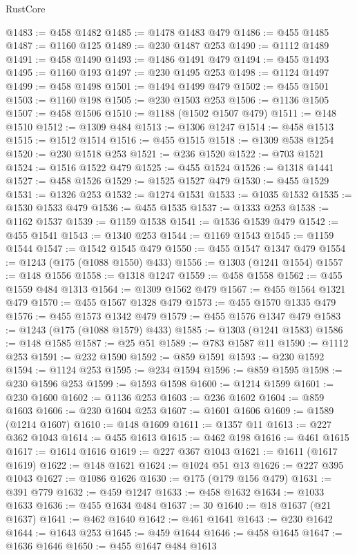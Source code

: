 \begin{lexlean}{RustCore}
\begin{coremodule}
@1483 := @458 @1482
@1485 := @1478 @1483 @479
@1486 := @455 @1485
@1487 := @1160 @125
@1489 := @230 @1487 @253
@1490 := @1112 @1489
@1491 := @458 @1490
@1493 := @1486 @1491 @479
@1494 := @455 @1493
@1495 := @1160 @193
@1497 := @230 @1495 @253
@1498 := @1124 @1497
@1499 := @458 @1498
@1501 := @1494 @1499 @479
@1502 := @455 @1501
@1503 := @1160 @198
@1505 := @230 @1503 @253
@1506 := @1136 @1505
@1507 := @458 @1506
@1510 := @1188 (@1502 @1507 @479)
@1511 := @148 @1510
@1512 := @1309 @484
@1513 := @1306 @1247
@1514 := @458 @1513
@1515 := @1512 @1514
@1516 := @455 @1515
@1518 := @1309 @538 @1254
@1520 := @230 @1518 @253
@1521 := @236 @1520
@1522 := @703 @1521
@1524 := @1516 @1522 @479
@1525 := @455 @1524
@1526 := @1318 @1441
@1527 := @458 @1526
@1529 := @1525 @1527 @479
@1530 := @455 @1529
@1531 := @1326 @253
@1532 := @1274 @1531
@1533 := @1035 @1532
@1535 := @1530 @1533 @479
@1536 := @455 @1535
@1537 := @1333 @253
@1538 := @1162 @1537
@1539 := @1159 @1538
@1541 := @1536 @1539 @479
@1542 := @455 @1541
@1543 := @1340 @253
@1544 := @1169 @1543
@1545 := @1159 @1544
@1547 := @1542 @1545 @479
@1550 := @455 @1547 @1347 @479
@1554 := @1243 (@175 (@1088 @1550) @433)
@1556 := @1303 (@1241 @1554)
@1557 := @148 @1556
@1558 := @1318 @1247
@1559 := @458 @1558
@1562 := @455 @1559 @484 @1313
@1564 := @1309 @1562 @479
@1567 := @455 @1564 @1321 @479
@1570 := @455 @1567 @1328 @479
@1573 := @455 @1570 @1335 @479
@1576 := @455 @1573 @1342 @479
@1579 := @455 @1576 @1347 @479
@1583 := @1243 (@175 (@1088 @1579) @433)
@1585 := @1303 (@1241 @1583)
@1586 := @148 @1585
@1587 := @25 @51
@1589 := @783 @1587 @11
@1590 := @1112 @253
@1591 := @232 @1590
@1592 := @859 @1591
@1593 := @230 @1592
@1594 := @1124 @253
@1595 := @234 @1594
@1596 := @859 @1595
@1598 := @230 @1596 @253
@1599 := @1593 @1598
@1600 := @1214 @1599
@1601 := @230 @1600
@1602 := @1136 @253
@1603 := @236 @1602
@1604 := @859 @1603
@1606 := @230 @1604 @253
@1607 := @1601 @1606
@1609 := @1589 (@1214 @1607)
@1610 := @148 @1609
@1611 := @1357 @11
@1613 := @227 @362 @1043
@1614 := @455 @1613
@1615 := @462 @198
@1616 := @461 @1615
@1617 := @1614 @1616
@1619 := @227 @367 @1043
@1621 := @1611 (@1617 @1619)
@1622 := @148 @1621
@1624 := @1024 @51 @13
@1626 := @227 @395 @1043
@1627 := @1086 @1626
@1630 := @175 (@179 @156 @479)
@1631 := @391 @779
@1632 := @459 @1247
@1633 := @458 @1632
@1634 := @1033 @1633
@1636 := @455 @1634 @484
@1637 := 30
@1640 := @18 @1637 (@21 @1637)
@1641 := @462 @1640
@1642 := @461 @1641
@1643 := @230 @1642
@1644 := @1643 @253
@1645 := @459 @1644
@1646 := @458 @1645
@1647 := @1636 @1646
@1650 := @455 @1647 @484 @1613

\end{coremodule}
\end{lexlean}
